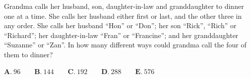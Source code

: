 Grandma calls her husband, son, daughter-in-law and granddaughter to dinner one at a time. She calls her husband either first or last, and the other three in any order. She calls her husband ``Hon'' or ``Don''; her son ``Rick'', ``Rich'' or ``Richard''; her daughter-in-law ``Fran'' or ``Francine''; and her granddaughter ``Suzanne'' or ``Zan''. In how many different ways could grandma call the four of them to dinner?

$\textbf{A.}\ 96\qquad\textbf{B.}\ 144\qquad\textbf{C.}\ 192\qquad\textbf{D.}\ 288\qquad\textbf{E.}\ 576$
